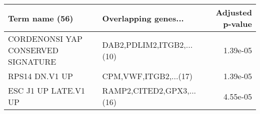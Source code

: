 \begin{tabular}{llr}
\toprule
                    Term name (56) &      Overlapping genes... &  Adjusted p-value \\
\midrule
CORDENONSI YAP CONSERVED SIGNATURE & DAB2,PDLIM2,ITGB2,...(10) &          1.39e-05 \\
                    RPS14 DN.V1 UP &     CPM,VWF,ITGB2,...(17) &          1.39e-05 \\
              ESC J1 UP LATE.V1 UP & RAMP2,CITED2,GPX3,...(16) &          4.55e-05 \\
\bottomrule
\end{tabular}
